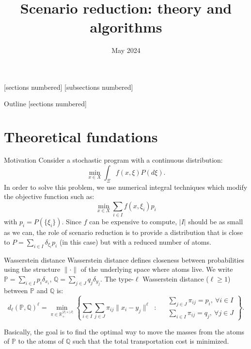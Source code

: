 \documentclass{beamer}
\title{Scenario reduction: theory and algorithms}
\date{May 2024}
\theoremstyle{plain}
\begin{document}
[sections numbered]
[subsections numbered]

\begin{frame}[plain]
 \maketitle
\end{frame}

\begin{frame}[noframenumbering]{Outline}
 [sections numbered]
 \tableofcontents[hideallsubsections]
\end{frame}

\section{Theoretical fundations}

\begin{frame}{Motivation}
 Consider a \alert{stochastic program} with a continuous distribution:
$$
\min_{x\in X}\int_\Xi f\left(x,\xi\right)P\left(d\xi\right).
$$
In order to solve this problem, we use numerical integral techniques which modify the objective function such as:
$$
\min_{x\in X}\sum_{i\in I}f\left(x,\xi_i\right)p_i
$$
with $p_i=P\left(\{\xi_i\}\right)$. Since $f$ can be expensive to compute, $\lvert I\rvert$ should be as small as we can, the role of scenario reduction is to provide a distribution that is close to $P=\sum_{i\in I}\delta_{\xi_i}p_i$ (in this case) but with a \alert{reduced number of atoms}.

 
\end{frame}


\begin{frame}{Wasserstein distance}
 Wasserstein distance defines closeness between probabilities using \alert{the structure $\lVert \cdot\rVert$ of the underlying space} where atoms live. We write $\mathbb{P}=\sum_{i\in I}p_i\delta_{x_i}$, $\mathbb{Q}=\sum_{j\in J }q_j\delta_{y_j}$. The type-$\ell$ Wasserstein distance ($\ell\geq1$) between $\mathbb{P}$ and $\mathbb{Q}$ is:
 \[
d_\ell(\mathbb{P},\mathbb{Q})^\ell=\min_{\pi\in\mathbb{R}_+^{\lvert I\rvert\times\lvert J\rvert}}\left\{ 
\sum_{i\in I}\sum_{j\in J}\pi_{ij}\lVert x_i-y_j\rVert^\ell \: \text{ : } \:  \begin{aligned}
& \sum_{j\in J}\pi_{ij}=p_i, \: \forall i\in I \\
& \sum_{i\in I}\pi_{ij}=q_j, \: \forall j\in J
\end{aligned}\right\}.
\]
\newline

Basically, the goal is to find \alert{the optimal way to move the masses} from the atoms of $\mathbb{P}$ to the atoms of $\mathbb{Q}$ such that \alert{the total transportation cost is minimized.}
\end{frame}
\end{document}
